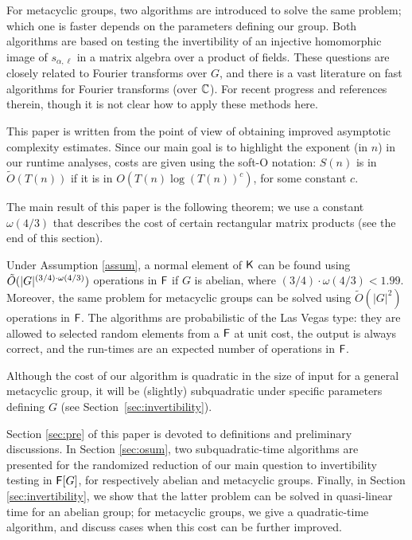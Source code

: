 For metacyclic groups, two algorithms are introduced to solve the same
problem; which one is faster depends on the parameters defining our
group. Both algorithms are based on testing the invertibility of an
injective homomorphic image of $s_{\alpha,\ell}$ in a matrix algebra over a
product of fields. These questions are closely related to Fourier
transforms over $G$, and there is a vast literature on fast algorithms for
Fourier transforms (over $\mathbb{C}$). For recent progress
\cite{ClaMu04,MaRockWol18} and references therein, though it is not clear
how to apply these methods here.

This paper is written from the point of view of obtaining improved
asymptotic complexity estimates. Since our main goal is to highlight
the exponent (in $n$) in our runtime analyses, costs are given using
the soft-O notation: $S(n)$ is in $\tilde{O}(T(n))$ if it is in
$O(T(n) \log(T(n))^c)$, for some constant $c$.

The main result of this paper is the following theorem; we use a
constant $\omega(4/3)$ that describes the cost of certain rectangular
matrix products (see the end of this section).

\begin{theorem}
  \label{thm:main}
  Under Assumption \ref{assum}, a normal element of ${\mathsf{K}}$ can be found using
  $\tilde{O}(\vert G \vert ^{(3/4)\cdot \omega(4/3)})$ operations in ${\mathsf{F}}$ if $G$ is abelian, where
  $(3/4)\cdot\omega(4/3)<1.99$.  Moreover, the same problem for metacyclic
  groups can be solved using $\tilde{O}(\vert G \vert^2)$ operations in
  ${\mathsf{F}}$. The algorithms are probabilistic of the Las Vegas type: they are
  allowed to selected random elements from a ${\mathsf{F}}$ at unit cost, the output
  is always correct, and the run-times are an expected number of operations
  in ${\mathsf{F}}$.
\end{theorem}

Although the cost of our algorithm is quadratic in the size of input for a
general metacyclic group, it will be (slightly) subquadratic under specific
parameters defining $G$ (see Section~\ref{sec:invertibility}).

Section \ref{sec:pre} of this paper is devoted to definitions and
preliminary discussions.  In Section \ref{sec:osum}, two
subquadratic-time algorithms are presented for the randomized reduction
of our main question to invertibility testing in ${\mathsf{F}}[G]$, for
respectively abelian and metacyclic groups.  Finally, in Section
\ref{sec:invertibility}, we show that the latter problem can be solved
in quasi-linear time for an abelian group; for metacyclic
groups, we give a quadratic-time algorithm, and discuss cases when
this cost can be further improved.

